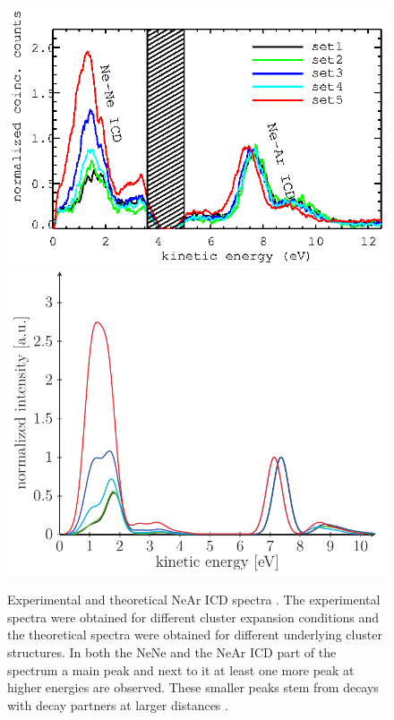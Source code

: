 \begin{figure}[h]
 \centering
 \includegraphics[width=\columnwidth]{pics/2dim_coincs.eps}\\
 \includegraphics[width=\columnwidth]{pics/NeArcluster_theospecs.pdf}
 \caption{Experimental and theoretical NeAr ICD spectra \cite{Fasshauer14_1}.
          The experimental spectra were obtained for different cluster expansion
          conditions and the theoretical spectra were obtained for different
          underlying cluster structures. In both the NeNe and the NeAr ICD part
          of the spectrum a main peak and next to it at least one more peak at
          higher energies are observed. These smaller peaks stem from decays
          with decay partners at larger distances \cite{Fasshauer13,Fasshauer14_1}.}
 \label{figure:near_spectra}
\end{figure}
